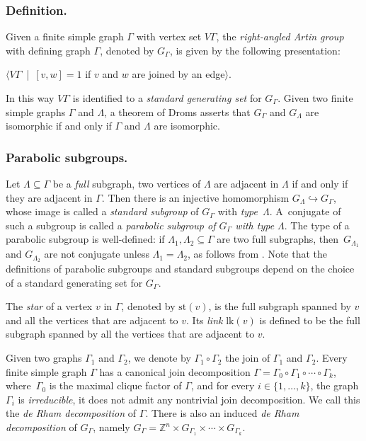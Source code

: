 \documentclass[JEP,XML,SOM,Unicode,NoFloatCountersInSection,published]{cedram}
\theoremstyle{plain}
\theoremstyle{definition}
\newcommand{\lk}{\mathrm{lk}}
\newcommand{\st}{\mathrm{st}}
\begin{document}
\label{sec:review}

\subsubsection*{Definition.} Given a finite simple graph $\Gamma$ with vertex set $V\Gamma$, the \emph{right-angled Artin group} with defining graph $\Gamma$, denoted by $G_\Gamma$, is given by the following presentation:
\begin{center}
$\langle V\Gamma$\ |\ $[v,w]=1$ if $v$ and $w$ are joined by an edge$\rangle$.
\end{center}
In this way $V\Gamma$ is identified to a \textit{standard generating set} for $G_\Gamma$. Given two finite simple graphs $\Gamma$ and $\Lambda$, a theorem of Droms \cite{Dro} asserts that $G_\Gamma$ and $G_\Lambda$ are isomorphic if and only if $\Gamma$ and $\Lambda$ are isomorphic.

\subsubsection*{Parabolic subgroups.} Let $\Lambda\!\subseteq\!\Gamma$ be a \emph{full} subgraph, \ie two vertices of $\Lambda$ are adja\-cent in $\Lambda$ if and only if they are adjacent in $\Gamma$. Then there is an injective homomorphism $G_{\Lambda}\hookrightarrow G_{\Gamma}$, whose image is called a \emph{standard subgroup} of $G_{\Gamma}$ with \emph{type}~$\Lambda$. A~conjugate of such a subgroup is called a \emph{parabolic subgroup of $G_\Gamma$ with type $\Lambda$}. The type of a parabolic subgroup is well-defined: if $\Lambda_1,\Lambda_2\subseteq\Gamma$ are two full subgraphs, then~$G_{\Lambda_1}$ and $G_{\Lambda_2}$ are not conjugate unless $\Lambda_1=\Lambda_2$, as follows from \hbox{\cite[Prop.\,2.2]{charney2007automorphisms}}. Note that the definitions of parabolic subgroups and standard subgroups depend on the choice of a standard generating set for $G_\Gamma$.

The \emph{star} of a vertex $v$ in $\Gamma$, denoted by $\st(v)$, is the full subgraph spanned by $v$ and all the vertices that are adjacent to $v$. Its \emph{link} $\lk(v)$ is defined to be the full subgraph spanned by all the vertices that are adjacent to $v$.

Given two graphs $\Gamma_1$ and $\Gamma_2$, we denote by $\Gamma_1\circ \Gamma_2$ the join of $\Gamma_1$ and $\Gamma_2$. Every finite simple graph $\Gamma$ has a canonical join decomposition $\Gamma=\Gamma_0\circ \Gamma_1\circ\cdots\circ\Gamma_k$, where~$\Gamma_0$ is the maximal clique factor of $\Gamma$, and for every $i\in\{1,\dots,k\}$, the graph $\Gamma_i$ is \emph{irreducible}, \ie it does not admit any nontrivial join decomposition. We call this the \emph{de Rham decomposition} of $\Gamma$. There is also an induced \emph{de Rham decomposition} of $G_\Gamma$, namely $G_\Gamma=\mathbb Z^n\times G_{\Gamma_1}\times\cdots\times G_{\Gamma_k}$.
\end{document}
